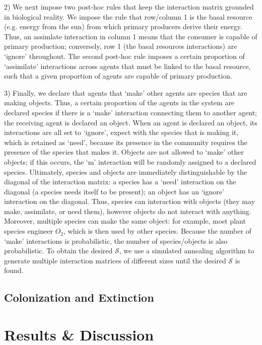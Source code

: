 \documentclass[twocolumn,preprintnumbers,amsmath,amssymb,superscriptaddress]{revtex4}
\begin{document}
2) We next impose two post-hoc rules that keep the interaction matrix grounded in biological reality.
We impose the rule that row/column 1 is the basal resource (e.g. energy from the sun) from which primary producers derive their energy.
Thus, an assimlate interaction in column 1 means that the consumer is capable of primary production; conversely, row 1 (the basal resources interactions) are `ignore' throughout.
The second post-hoc rule imposes a certain proportion of `assimilate' interactions across agents that must be linked to the basal resource, such that a given proportion of agents are capable of primary production.

3) Finally, we declare that agents that `make' other agents are species that are making objects.
Thus, a certain proportion of the agents in the system are declared species if there is a `make' interaction connecting them to another agent; the receiving agent is declared an object.
When an agent is declared an object, its interactions are all set to `ignore', expect with the species that is making it, which is retained as `need', because its presence in the community requires the presence of the species that makes it.
Objects are not allowed to `make' other objects; if this occurs, the `m' interaction will be randomly assigned to a declared species.
Ultimately, species and objects are immediately distinguishable by the diagonal of the interaction matrix: a species has a `need' interaction on the diagonal (a species needs itself to be present); an object has an `ignore' interaction on the diagonal.
Thus, species can interaction with objects (they may make, assimilate, or need them), however objects do not interact with anything.
Moreover, multiple species can make the same object: for example, most plant species engineer $O_2$, which is then used by other species.
Because the number of `make' interactions is probabilistic, the number of species/objects is also probabilistic.
To obtain the desired $\mathcal{S}$, we use a simulated annealing algorithm to generate multiple interaction matrices of different sizes until the desired $\mathcal{S}$ is found.

\subsection{Colonization and Extinction}


\section*{Results \& Discussion}
\end{document}
